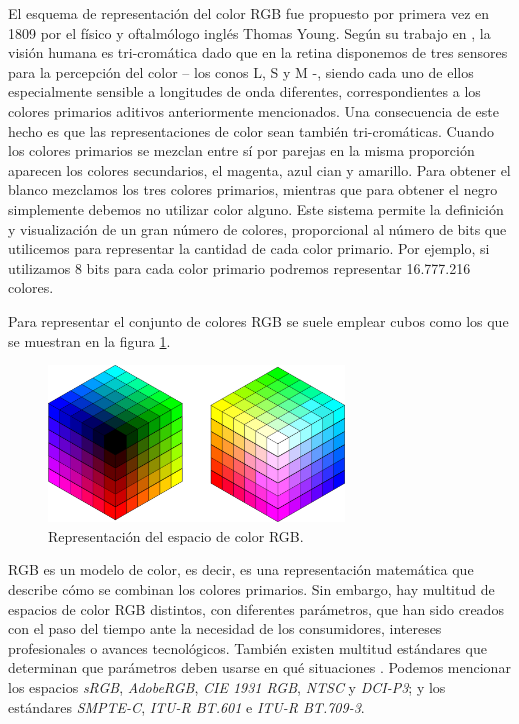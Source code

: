 El esquema de representación del color RGB fue propuesto por primera vez en 1809 por el físico y oftalmólogo inglés Thomas Young. Según su trabajo en \cite{rgbtrivision}, la visión humana es tri-cromática dado que en la retina  disponemos de tres sensores para la percepción del color – los conos L, S y M -, siendo cada uno de ellos especialmente sensible a longitudes de onda diferentes, correspondientes a los colores primarios aditivos anteriormente mencionados. Una consecuencia de este hecho es que las representaciones de color sean también tri-cromáticas. Cuando los colores primarios se mezclan entre sí por parejas en la misma proporción aparecen los colores secundarios, el magenta, azul cian y amarillo. Para obtener el blanco mezclamos los tres colores primarios, mientras que para obtener el negro simplemente debemos no utilizar color alguno. Este sistema permite la definición y visualización de un gran número de colores, proporcional al número de bits que utilicemos para representar la cantidad de cada color primario. Por ejemplo, si utilizamos 8 bits para cada color primario podremos representar 16.777.216 colores.

Para representar el conjunto de colores RGB se suele emplear cubos como los que se muestran en la figura \ref{fig:cubosRGB}.

\begin{figure}[h!]
    \centering
    \includegraphics[width=0.7\textwidth,height=0.7\textheight,keepaspectratio]{imagenes/parte_BS/cubos_rgb.png}    
    \caption{Representación del espacio de color RGB.}
    \label{fig:cubosRGB}
\end{figure}

RGB es un modelo de color, es decir, es una representación matemática que describe cómo se combinan los colores primarios. Sin embargo, hay multitud de espacios de color RGB distintos, con diferentes parámetros, que han sido creados con el paso del tiempo ante la necesidad de los consumidores, intereses profesionales o avances tecnológicos. También existen multitud estándares que determinan que parámetros deben usarse en qué situaciones \cite{rgbtrivision}. Podemos mencionar los espacios \textit{sRGB}, \textit{AdobeRGB}, \textit{CIE 1931 RGB}, \textit{NTSC} y \textit{DCI-P3}; y los estándares \textit{SMPTE-C}, \textit{ITU-R BT.601} e \textit{ITU-R BT.709-3}.

